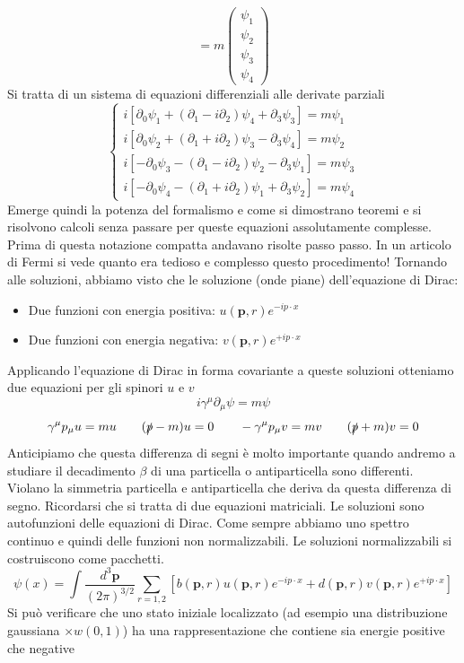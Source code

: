 \begin{equation*}
   = m \begin{pmatrix} \psi_1 \\ \psi_2 \\ \psi_3 \\ \psi_4 \end{pmatrix}
\end{equation*}
Si tratta di un sistema di equazioni differenziali alle derivate parziali
$$
\begin{cases}
i[\partial_0 \psi_1 + (\partial_1 - i\partial_2)\psi_4 + \partial_3 \psi_3] = m\psi_1 \\
i[\partial_0 \psi_2 + (\partial_1 + i\partial_2)\psi_3 - \partial_3 \psi_4] = m\psi_2 \\
i[-\partial_0 \psi_3 - (\partial_1 - i\partial_2)\psi_2 - \partial_3 \psi_1] = m\psi_3 \\
i[-\partial_0 \psi_4 - (\partial_1 + i\partial_2)\psi_1 + \partial_3 \psi_2] = m\psi_4
\end{cases}
$$
Emerge quindi la potenza del formalismo e come si dimostrano teoremi e si risolvono calcoli senza passare per queste equazioni assolutamente complesse. Prima di questa notazione compatta andavano risolte passo passo. In un articolo di Fermi si vede quanto era tedioso e complesso questo procedimento!
Tornando alle soluzioni, abbiamo visto che le soluzione (onde piane) dell'equazione di Dirac:
\begin{itemize}
    \item Due funzioni con energia positiva: $u(\mathbf{p},r)e^{-ip\cdot x}$
    \item Due funzioni con energia negativa: $v(\mathbf{p},r)e^{+ip\cdot x}$
\end{itemize}
Applicando l'equazione di Dirac in forma covariante a queste soluzioni otteniamo due equazioni per gli spinori $u$ e $v$
\begin{equation*}
    i\gamma^\mu\partial_\mu\psi=m\psi
\end{equation*}
$$
\gamma^\mu p_\mu u = mu \qquad (\slashed{p} - m)u = 0 \qquad -\gamma^\mu p_\mu v = mv \qquad (\slashed{p} + m)v = 0
$$
Anticipiamo che questa differenza di segni è molto importante quando andremo a studiare il decadimento $\beta$ di una particella o antiparticella sono differenti. Violano la simmetria particella e antiparticella che deriva da questa differenza di segno.
Ricordarsi che si tratta di due equazioni matriciali. Le soluzioni sono autofunzioni delle equazioni di Dirac. Come sempre abbiamo uno spettro continuo e quindi delle funzioni non normalizzabili. Le soluzioni normalizzabili si costruiscono come pacchetti.
$$
\psi(x) = \int \frac{d^3\mathbf{p}}{(2\pi)^{3/2}} \sum_{r=1,2} \left[ b(\mathbf{p}, r) u(\mathbf{p}, r) e^{-ip \cdot x} + d(\mathbf{p}, r) v(\mathbf{p}, r) e^{+ip \cdot x} \right]
$$
Si può verificare che uno stato iniziale localizzato (ad esempio una distribuzione gaussiana $\times w(0,1)$) ha una rappresentazione che contiene sia energie positive che negative
